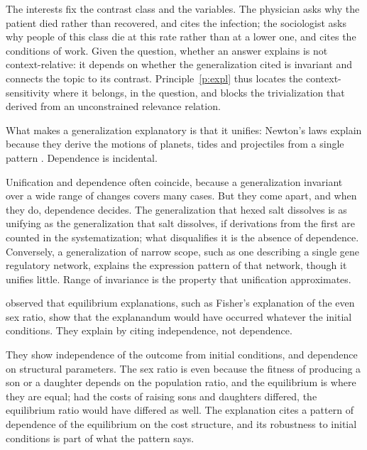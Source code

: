 \documentclass{situationist-preprint}
\begin{document}
\begin{reply}
The interests fix the contrast class and the variables. The physician asks why the patient died rather than recovered, and cites the infection; the sociologist asks why people of this class die at this rate rather than at a lower one, and cites the conditions of work. Given the question, whether an answer explains is not context-relative: it depends on whether the generalization cited is invariant and connects the topic to its contrast. Principle~\ref{p:expl} thus locates the context-sensitivity where it belongs, in the question, and blocks the trivialization that \citet{KitcherSalmon1987} derived from an unconstrained relevance relation.
\end{reply}

\begin{objection}[Unification]
What makes a generalization explanatory is that it unifies: Newton's laws explain because they derive the motions of planets, tides and projectiles from a single pattern \citep{Kitcher1989}. Dependence is incidental.
\end{objection}

\begin{reply}
Unification and dependence often coincide, because a generalization invariant over a wide range of changes covers many cases. But they come apart, and when they do, dependence decides. The generalization that hexed salt dissolves is as unifying as the generalization that salt dissolves, if derivations from the first are counted in the systematization; what disqualifies it is the absence of dependence. Conversely, a generalization of narrow scope, such as one describing a single gene regulatory network, explains the expression pattern of that network, though it unifies little. Range of invariance is the property that unification approximates.
\end{reply}

\begin{objection}
\citet{Sober1983} observed that equilibrium explanations, such as Fisher's explanation of the even sex ratio, show that the explanandum would have occurred whatever the initial conditions. They explain by citing independence, not dependence.
\end{objection}

\begin{reply}
They show independence of the outcome from initial conditions, and dependence on structural parameters. The sex ratio is even because the fitness of producing a son or a daughter depends on the population ratio, and the equilibrium is where they are equal; had the costs of raising sons and daughters differed, the equilibrium ratio would have differed as well. The explanation cites a pattern of dependence of the equilibrium on the cost structure, and its robustness to initial conditions is part of what the pattern says.
\end{reply}
\end{document}
